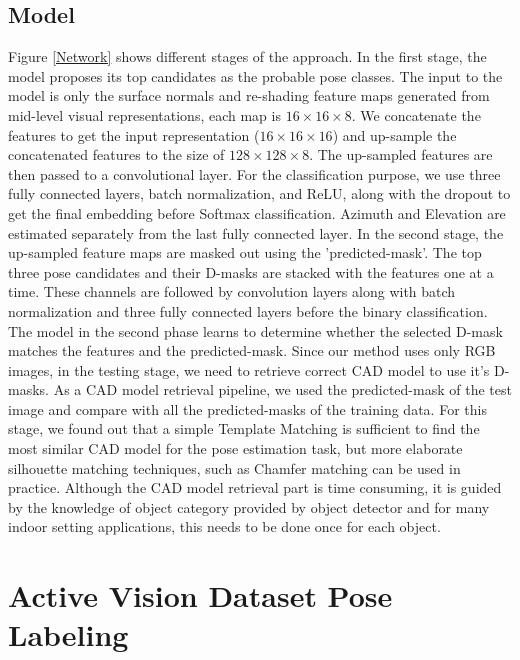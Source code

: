 \documentclass[letterpaper, 10 pt, conference]{ieeeconf}  \pdfoutput=1
\begin{document}
\subsection{Model}
\label{Model}
Figure \ref{Network} shows different stages of the approach. In the first stage, the model proposes its top candidates as the probable pose classes. The input to the model is only the surface normals and re-shading feature maps generated from mid-level visual representations, each map is $16 \times 16 \times 8$. We concatenate the features to get the input representation ($16 \times 16 \times 16$) and up-sample the concatenated features to the size of $128 \times 128 \times 8$. The up-sampled features are then passed to a convolutional layer. For the classification purpose, we use three fully connected layers, batch normalization, and ReLU, along with the dropout to get the final embedding before Softmax classification. Azimuth and Elevation are estimated separately from the last fully connected layer.
In the second stage, the up-sampled feature maps are masked out using the 'predicted-mask'. The top three pose candidates and their D-masks are stacked with the features one at a time.
These channels are followed by convolution layers along with batch normalization and three fully connected layers before the binary classification. The model in the second phase learns to determine whether the selected D-mask matches the features and the predicted-mask. Since our method uses only RGB images, in the testing stage, we need to retrieve correct CAD model to use it's D-masks. As a CAD model retrieval pipeline, we used the predicted-mask of the test image and compare with all the predicted-masks of the training data. For this stage, we found out that a simple Template Matching is sufficient to find the most similar CAD model for the pose estimation task, but more elaborate silhouette matching techniques, such as Chamfer matching can be used in practice. Although the CAD model retrieval part is time consuming, it is guided by the knowledge of object category provided by object detector and for many indoor setting applications, this needs to be done once for each object.













\section{Active Vision Dataset Pose Labeling}
\end{document}
